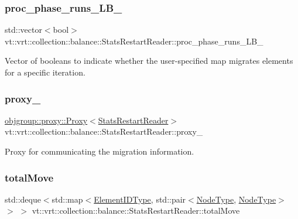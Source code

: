 \subsubsection{\texorpdfstring{proc\+\_\+phase\+\_\+runs\+\_\+\+L\+B\+\_\+}{proc\_phase\_runs\_LB\_}}
{\footnotesize\ttfamily std\+::vector$<$bool$>$ vt\+::vrt\+::collection\+::balance\+::\+Stats\+Restart\+Reader\+::proc\+\_\+phase\+\_\+runs\+\_\+\+L\+B\+\_\+\hspace{0.3cm}{\ttfamily [private]}}



Vector of booleans to indicate whether the user-\/specified map migrates elements for a specific iteration. 

\mbox{\label{structvt_1_1vrt_1_1collection_1_1balance_1_1_stats_restart_reader_ad4039b19a32b7269be28d2a66322c7e3}} 
\subsubsection{\texorpdfstring{proxy\+\_\+}{proxy\_}}
{\footnotesize\ttfamily \hyperlink{structvt_1_1objgroup_1_1proxy_1_1_proxy}{objgroup\+::proxy\+::\+Proxy}$<$\hyperlink{structvt_1_1vrt_1_1collection_1_1balance_1_1_stats_restart_reader}{Stats\+Restart\+Reader}$>$ vt\+::vrt\+::collection\+::balance\+::\+Stats\+Restart\+Reader\+::proxy\+\_\+\hspace{0.3cm}{\ttfamily [private]}}



Proxy for communicating the migration information. 

\mbox{\label{structvt_1_1vrt_1_1collection_1_1balance_1_1_stats_restart_reader_aabfc46df6681168e7f982c8b7ea5c778}} 
\subsubsection{\texorpdfstring{total\+Move}{totalMove}}
{\footnotesize\ttfamily std\+::deque$<$std\+::map$<$\hyperlink{namespacevt_1_1vrt_1_1collection_1_1balance_a14c8d2c972f2913aa3f1636e5be0a120}{Element\+I\+D\+Type}, std\+::pair$<$\hyperlink{namespacevt_a866da9d0efc19c0a1ce79e9e492f47e2}{Node\+Type}, \hyperlink{namespacevt_a866da9d0efc19c0a1ce79e9e492f47e2}{Node\+Type}$>$ $>$ $>$ vt\+::vrt\+::collection\+::balance\+::\+Stats\+Restart\+Reader\+::total\+Move\hspace{0.3cm}{\ttfamily [private]}}



